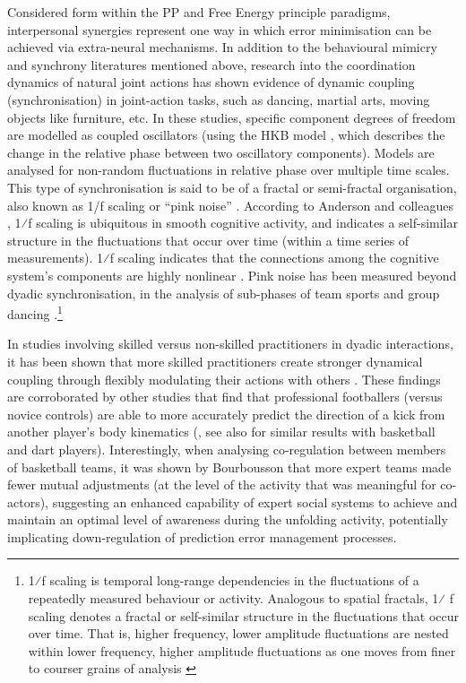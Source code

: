 \begin{mccorrection}
Considered form within the PP and Free Energy principle paradigms, interpersonal synergies represent one way in which error minimisation can be achieved via extra-neural mechanisms.  In addition to the behavioural mimicry and synchrony literatures mentioned above, research into the coordination dynamics of natural joint actions  has shown evidence of dynamic coupling (synchronisation) in joint-action tasks, such as dancing, martial arts, moving objects like furniture, etc. In these studies, specific component degrees of freedom are modelled as coupled oscillators (using the HKB model \citep{Haken1985,Kelso1986}, which describes the change in the relative phase between two oscillatory components). Models are analysed for non-random fluctuations in relative phase over multiple time scales.  This type of synchronisation is said to be of a fractal or semi-fractal organisation, also known as 1/f scaling or ``pink noise'' \citep{Caron2017}. According to Anderson and colleagues \citep{Anderson2012}, 1⁄f scaling is ubiquitous in smooth cognitive activity, and indicates a self-similar structure in the fluctuations that occur over time (within a time series of measurements).
1⁄f scaling indicates that the connections among the cognitive system's components are highly nonlinear \citep{Ding2002,Holden2013,Kello2010,Riley2011,VanOrden2003,VanOrden2005}. Pink noise has been measured beyond dyadic synchronisation, in the analysis of sub-phases of team sports \citep{Passos2014,Duarte2012} and group dancing \citep{Chauvigne2017}.\footnote{1⁄f scaling is temporal long-range dependencies in the fluctuations of a repeatedly measured behaviour or activity. Analogous to spatial fractals, 1⁄ f scaling denotes a fractal or self-similar structure in the fluctuations that occur over time. That is, higher frequency, lower amplitude fluctuations are nested within lower frequency, higher amplitude fluctuations as one moves from finer to courser grains of analysis \cites(for a more detailed description see, for example)(){Holden2005}{Kello2009}}

In studies involving skilled versus non-skilled practitioners in dyadic interactions, it has been shown that more skilled practitioners create stronger dynamical coupling through flexibly modulating their actions with others \citep{Schmidt2011, Caron2017}. These findings are corroborated by other studies that find that professional footballers (versus novice controls) are able to more accurately predict the direction of a kick from another player's body kinematics (\cite{Tomeo2012}, see also \cite{Aglioti2008,Mulligan2016} for similar results with basketball and dart players). Interestingly, when analysing co-regulation between members of basketball teams, it was shown by Bourbousson \textcite{Bourbousson2015} that more expert teams made fewer mutual adjustments (at the level of the activity that was meaningful for co-actors), suggesting an enhanced capability of expert social systems to achieve and maintain an optimal level of awareness during the unfolding activity, potentially implicating down-regulation of prediction error management processes.


\end{mccorrection}
